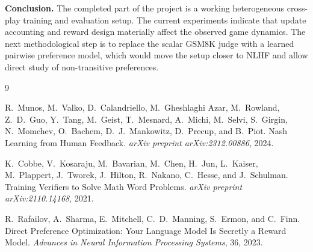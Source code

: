 \documentclass[10pt,a4paper]{article}
\begin{document}
\textbf{Conclusion.}
The completed part of the project is a working heterogeneous cross-play training and evaluation setup. The current experiments indicate that update accounting and reward design materially affect the observed game dynamics. The next methodological step is to replace the scalar GSM8K judge with a learned pairwise preference model, which would move the setup closer to NLHF and allow direct study of non-transitive preferences.

\FloatBarrier
\begin{thebibliography}{9}

R.~Munos, M.~Valko, D.~Calandriello, M.~Gheshlaghi Azar, M.~Rowland, Z.~D.~Guo, Y.~Tang, M.~Geist, T.~Mesnard, A.~Michi, M.~Selvi, S.~Girgin, N.~Momchev, O.~Bachem, D.~J.~Mankowitz, D.~Precup, and B.~Piot.
\newblock Nash Learning from Human Feedback.
\newblock \emph{arXiv preprint arXiv:2312.00886}, 2024.

K.~Cobbe, V.~Kosaraju, M.~Bavarian, M.~Chen, H.~Jun, L.~Kaiser, M.~Plappert, J.~Tworek, J.~Hilton, R.~Nakano, C.~Hesse, and J.~Schulman.
\newblock Training Verifiers to Solve Math Word Problems.
\newblock \emph{arXiv preprint arXiv:2110.14168}, 2021.

R.~Rafailov, A.~Sharma, E.~Mitchell, C.~D.~Manning, S.~Ermon, and C.~Finn.
\newblock Direct Preference Optimization: Your Language Model Is Secretly a Reward Model.
\newblock \emph{Advances in Neural Information Processing Systems}, 36, 2023.

\end{thebibliography}
\end{document}
